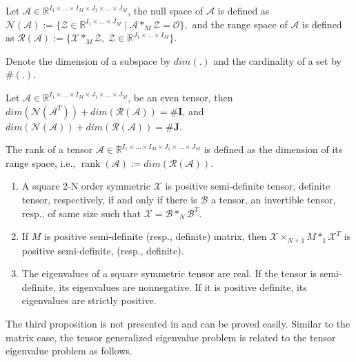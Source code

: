 \documentclass{siamltex}
\begin{document}
\begin{definition}
Let $\mathcal{A} \in \mathbb{R}^{I_1 \times \ldots \times I_M \times J_1 \times \ldots \times J_M}$, the null space of $\mathcal{A}$ is defined as
$\mathcal{N}(\mathcal{A}):=\{\mathcal{Z} \in \mathbb{R}^{I_1 \times \ldots \times J_M} \; | \; \mathcal{A} *_M \mathcal{Z}=\mathcal{O}\},$
and the range space of $\mathcal{A}$ is defined as
$\mathcal{R}(\mathcal{A}):=\{\mathcal{X} *_M \mathcal{Z}, \; \mathcal{Z} \in \mathbb{R}^{J_1 \times \ldots \times I_M}\}.$
\end{definition}

\medskip
\noindent
Denote the dimension of a subspace by $dim(.)$ and the cardinality of a set by $\#(.)$.
\begin{lemma}\cite{ji2018drazin}
Let $\mathcal{A} \in \mathbb{R}^{I_1 \times \ldots \times I_M \times J_1 \times \ldots \times J_M}$, be an even tensor, then
$dim(\mathcal{N}(\mathcal{A}^T))+dim(\mathcal{R}(\mathcal{A}))= \# \mathbf{I}$, and $dim(\mathcal{N}(\mathcal{A}))+dim(\mathcal{R}(\mathcal{A}))= \# \mathbf{J} $.
\end{lemma}
\begin{definition}
The rank of a tensor $\mathcal{A} \in \mathbb{R}^{I_1 \times \ldots \times I_M \times J_1 \times \ldots \times J_M}$ is defined as the dimension of its range space, i.e., $\operatorname{rank}(\mathcal{A}):= dim(\mathcal{R}(\mathcal{A}))$. 
\end{definition}

\medskip
\begin{lemma}\label{prop:symmetric_XMXt}\cite{zahir2024higher}
\begin{enumerate}[label=\arabic*.]
\item A square 2-N order symmetric $\mathcal{X}$ is positive semi-definite tensor, definite tensor, respectively, if and only if there is $\mathcal{B}$ a tensor, an invertible tensor, resp., of same size such that $\mathcal{X}=\mathcal{B} *_N \mathcal{B}^T$.
\item If $M$ is positive semi-definite (resp., definite) matrix, then $\mathcal{X} \times_{N+1} M *_1 \mathcal{X}^T$ is positive semi-definite, (resp., definite).
\item The eigenvalues of a square symmetric tensor are real. If the tensor is semi-definite, its eigenvalues are nonnegative. If it is positive definite, its eigenvalues are strictly positive.
\end{enumerate}
\end{lemma}
\noindent
The third proposition is not presented in \cite{zahir2024higher} and can be proved easily. 
Similar to the matrix case, the tensor generalized eigenvalue problem is related to the tensor eigenvalue problem as follows.
\end{document}
